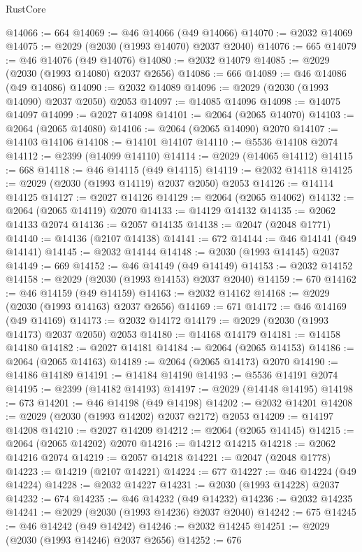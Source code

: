 \begin{lexlean}{RustCore}
\begin{coremodule}
@14066 := 664
@14069 := @46 @14066 (@49 @14066)
@14070 := @2032 @14069
@14075 := @2029 (@2030 (@1993 @14070) @2037 @2040)
@14076 := 665
@14079 := @46 @14076 (@49 @14076)
@14080 := @2032 @14079
@14085 := @2029 (@2030 (@1993 @14080) @2037 @2656)
@14086 := 666
@14089 := @46 @14086 (@49 @14086)
@14090 := @2032 @14089
@14096 := @2029 (@2030 (@1993 @14090) @2037 @2050) @2053
@14097 := @14085 @14096
@14098 := @14075 @14097
@14099 := @2027 @14098
@14101 := @2064 (@2065 @14070)
@14103 := @2064 (@2065 @14080)
@14106 := @2064 (@2065 @14090) @2070
@14107 := @14103 @14106
@14108 := @14101 @14107
@14110 := @5536 @14108 @2074
@14112 := @2399 (@14099 @14110)
@14114 := @2029 (@14065 @14112)
@14115 := 668
@14118 := @46 @14115 (@49 @14115)
@14119 := @2032 @14118
@14125 := @2029 (@2030 (@1993 @14119) @2037 @2050) @2053
@14126 := @14114 @14125
@14127 := @2027 @14126
@14129 := @2064 (@2065 @14062)
@14132 := @2064 (@2065 @14119) @2070
@14133 := @14129 @14132
@14135 := @2062 @14133 @2074
@14136 := @2057 @14135
@14138 := @2047 (@2048 @1771)
@14140 := @14136 (@2107 @14138)
@14141 := 672
@14144 := @46 @14141 (@49 @14141)
@14145 := @2032 @14144
@14148 := @2030 (@1993 @14145) @2037
@14149 := 669
@14152 := @46 @14149 (@49 @14149)
@14153 := @2032 @14152
@14158 := @2029 (@2030 (@1993 @14153) @2037 @2040)
@14159 := 670
@14162 := @46 @14159 (@49 @14159)
@14163 := @2032 @14162
@14168 := @2029 (@2030 (@1993 @14163) @2037 @2656)
@14169 := 671
@14172 := @46 @14169 (@49 @14169)
@14173 := @2032 @14172
@14179 := @2029 (@2030 (@1993 @14173) @2037 @2050) @2053
@14180 := @14168 @14179
@14181 := @14158 @14180
@14182 := @2027 @14181
@14184 := @2064 (@2065 @14153)
@14186 := @2064 (@2065 @14163)
@14189 := @2064 (@2065 @14173) @2070
@14190 := @14186 @14189
@14191 := @14184 @14190
@14193 := @5536 @14191 @2074
@14195 := @2399 (@14182 @14193)
@14197 := @2029 (@14148 @14195)
@14198 := 673
@14201 := @46 @14198 (@49 @14198)
@14202 := @2032 @14201
@14208 := @2029 (@2030 (@1993 @14202) @2037 @2172) @2053
@14209 := @14197 @14208
@14210 := @2027 @14209
@14212 := @2064 (@2065 @14145)
@14215 := @2064 (@2065 @14202) @2070
@14216 := @14212 @14215
@14218 := @2062 @14216 @2074
@14219 := @2057 @14218
@14221 := @2047 (@2048 @1778)
@14223 := @14219 (@2107 @14221)
@14224 := 677
@14227 := @46 @14224 (@49 @14224)
@14228 := @2032 @14227
@14231 := @2030 (@1993 @14228) @2037
@14232 := 674
@14235 := @46 @14232 (@49 @14232)
@14236 := @2032 @14235
@14241 := @2029 (@2030 (@1993 @14236) @2037 @2040)
@14242 := 675
@14245 := @46 @14242 (@49 @14242)
@14246 := @2032 @14245
@14251 := @2029 (@2030 (@1993 @14246) @2037 @2656)
@14252 := 676

\end{coremodule}
\end{lexlean}
